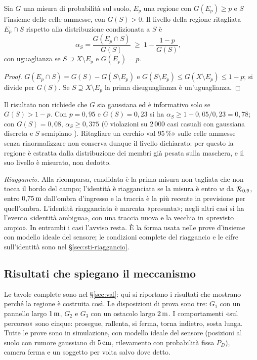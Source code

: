 \begin{proposizione}\label{prop:occ-ritaglio}
Sia $G$ una misura di probabilità sul suolo, $E_p$ una regione con $G(E_p)\ge p$ e $S$ l'insieme delle celle ammesse, con $G(S)>0$. Il livello della regione ritagliata $E_p\cap S$ rispetto alla distribuzione condizionata a $S$ è
\begin{equation}\label{eq:occ-ritaglio}
\alpha_S=\frac{G(E_p\cap S)}{G(S)}\;\ge\;1-\frac{1-p}{G(S)},
\end{equation}
con uguaglianza se $S\supseteq X\setminus E_p$ e $G(E_p)=p$. 
\end{proposizione}
\begin{proof}
$G(E_p\cap S)=G(S)-G(S\setminus E_p)$ e $G(S\setminus E_p)\le G(X\setminus E_p)\le1-p$; si divide per $G(S)$. Se $S\supseteq X\setminus E_p$ la prima disuguaglianza è un'uguaglianza.
\end{proof}

Il risultato non richiede che $G$ sia gaussiana ed è informativo solo se $G(S)>1-p$. Con $p=0{,}95$ e $G(S)=0{,}23$ si ha $\alpha_S\ge1-0{,}05/0{,}23=0{,}78$; con $G(S)=0{,}08$, $\alpha_S\ge0{,}375$ (0 violazioni su 2\,000 casi casuali con gaussiana discreta e $S$ semipiano ). Ritagliare un cerchio «al 95\,\%» sulle celle ammesse senza rinormalizzare non conserva dunque il livello dichiarato: per questo la regione è estratta dalla distribuzione dei membri già pesata sulla maschera, e il suo livello è misurato, non dedotto.

\emph{Riaggancio.} Alla ricomparsa, candidata è la prima misura non tagliata che non tocca il bordo del campo; l'identità è riagganciata se la misura è entro $w$ da $\mathcal{R}_{0,9}$, entro $0{,}75\,\mathrm{m}$ dall'ombra d'ingresso e la traccia è la più recente in previsione per quell'ombra. L'identità riagganciata è marcata «presunta»; negli altri casi si ha l'evento «identità ambigua», con una traccia nuova e la vecchia in «previsto ampio». In entrambi i casi l'avviso resta. È la forma usata nelle prove d'insieme con modello ideale del sensore; le condizioni complete del riaggancio e le cifre sull'identità sono nel \S\ref{sec:sti-riaggancio}.

\subsection{Risultati che spiegano il meccanismo}\label{sec:occ-risultati}

Le tavole complete sono nel \S\ref{sec:val}; qui si riportano i risultati che mostrano perché la regione è costruita così. Le disposizioni di prova sono tre: $G_1$ con un pannello largo $1\,\mathrm{m}$, $G_2$ e $G_3$ con un ostacolo largo $2\,\mathrm{m}$. I comportamenti «sul percorso» sono cinque: prosegue, rallenta, si ferma, torna indietro, sosta lunga. Tutte le prove sono in simulazione, con modello ideale del sensore (posizioni al suolo con rumore gaussiano di $5\,\mathrm{cm}$, rilevamento con probabilità fissa $P_D$), camera ferma e un soggetto per volta salvo dove detto.

